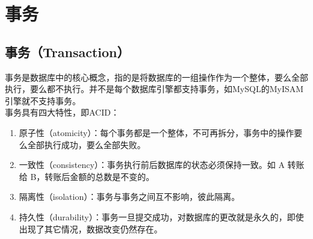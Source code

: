 \documentclass[12pt, openany, oneside]{book}
\begin{document}






\chapter{事务}

\section{事务（Transaction）}

事务是数据库中的核心概念，指的是将数据库的一组操作作为一个整体，要么全部执行，要么都不执行。并不是每个数据库引擎都支持事务，如MySQL的MyISAM引擎就不支持事务。 \\

事务具有四大特性，即ACID：

\begin{enumerate}
    \item 原子性（atomicity）：每个事务都是一个整体，不可再拆分，事务中的操作要么全部执行成功，要么全部失败。

    \item 一致性（consistency）：事务执行前后数据库的状态必须保持一致。如 A 转账给 B，转账后金额的总数是不变的。

    \item 隔离性（isolation）：事务与事务之间互不影响，彼此隔离。

    \item 持久性（durability）：事务一旦提交成功，对数据库的更改就是永久的，即使出现了其它情况，数据改变仍然存在。
\end{enumerate}
\end{document}
